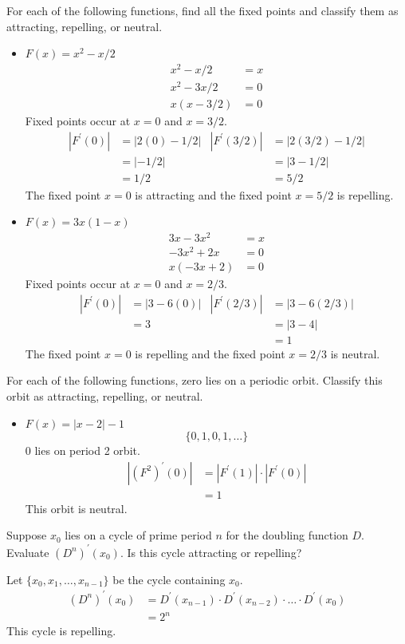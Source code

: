 \documentclass[12pt]{article}
\newenvironment{exercise}[2][Exercise]{\begin{trivlist}
\item[\hskip \labelsep {\bfseries #1} \hskip \labelsep {\bfseries #2.}]}{\end{trivlist}}
\begin{document}
\begin{exercise}{1} 
	For each of the following functions, find all the fixed points and classify them as attracting, repelling, or neutral.
	\begin{itemize}
		\item[a.] $F(x) = x^2 - x/2$
			\begin{align*}
				x^2 - x/2 &= x \\ 
				x^2 - 3x/2 &= 0 \\
				x(x - 3/2) &=0
			\end{align*}
			Fixed points occur at $x = 0$ and $x = 3/2$.
			\begin{align*}
				|F^{'}(0)| &= |2(0) - 1/2| & |F^{'}(3/2)| &= |2(3/2) - 1/2| \\
					   &= |-1/2| & 			  &= |3 - 1/2| \\
					   &= 1/2 & 			  &= 5/2
			\end{align*}
			The fixed point $x = 0$ is attracting and the fixed point $x = 5/2$ is repelling.
		\item[c.] $F(x) = 3x(1 - x)$
			\begin{align*}
				3x - 3x^2 &= x \\
				-3x^2 + 2x &= 0 \\
				x(-3x + 2) &= 0
			\end{align*}
			Fixed points occur at $x = 0$ and $x = 2/3$.
			\begin{align*}
				|F^{'}(0)| &= |3 - 6(0)| & |F^{'}(2/3)| &= |3 - 6(2/3)| \\
					   &= 3 & 			&= |3 - 4| \\
					   && 				&= 1
			\end{align*}
			The fixed point $x = 0$ is repelling and the fixed point $x = 2/3$ is neutral.
	\end{itemize}
\end{exercise}

\begin{exercise}{2} For each of the following functions, zero lies on a periodic orbit. Classify this orbit as attracting, repelling, or neutral.
	
\end{exercise}
\begin{itemize}
	\item[d.] $F(x) = |x - 2| - 1$
		\[
			\{0,1,0,1, \ldots \}
		\]
		0 lies on period 2 orbit.
		\begin{align*}
			|(F^{2})^{'}(0)| &= |F^{'}(1)|\cdot|F^{'}(0)| \\
				       &= 1
		\end{align*}
		This orbit is neutral.
\end{itemize}
\begin{exercise}{3}
	Suppose $x_{0}$ lies on a cycle of prime period $n$ for the doubling function $D$. Evaluate $(D^n)^{'}(x_0)$. Is this cycle attracting or repelling?
\end{exercise}
Let $\{x_0,x_1,\ldots,x_{n-1}\}$ be the cycle containing $x_0$.
\begin{align*}
	(D^{n})^{'}(x_0) &= D^{'}(x_{n-1}) \cdot D^{'}(x_{n-2}) \cdot \ldots \cdot D^{'}(x_0) \\
			 &= 2^n
\end{align*}
This cycle is repelling.
\end{document}
